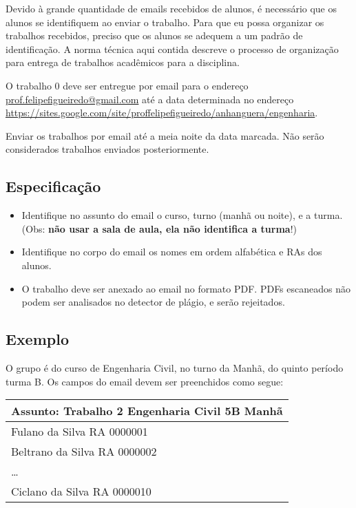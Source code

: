 \documentclass[a4paper]{article}
\begin{document}
Devido à grande quantidade de emails recebidos de alunos, é necessário
que os alunos se identifiquem ao enviar o trabalho. Para que eu possa
organizar os trabalhos recebidos, preciso que os alunos se adequem a
um padrão de identificação. A norma técnica aqui contida descreve o
processo de organização para entrega de trabalhos acadêmicos para a
disciplina.

O trabalho 0 deve ser entregue por email para o endereço
\url{prof.felipefigueiredo@gmail.com} até a data determinada no
endereço
\url{https://sites.google.com/site/proffelipefigueiredo/anhanguera/engenharia}.
 
Enviar os trabalhos por email até a meia noite da data marcada. Não
serão considerados trabalhos enviados posteriormente.

\subsection{Especificação}

\begin{itemize}
\item Identifique no assunto do email o curso, turno (manhã ou noite),
  e a turma. (Obs: {\bf não usar a sala de aula, ela não identifica a turma}!)
\item Identifique no corpo do email os nomes em ordem alfabética e RAs
  dos alunos.
\item O trabalho deve ser anexado ao email no formato PDF. PDFs
  escaneados não podem ser analisados no detector de plágio, e serão
  rejeitados.
\end{itemize}

\subsection{Exemplo}

O grupo é do curso de Engenharia Civil, no turno da Manhã, do quinto
período turma B. Os campos do email devem ser preenchidos como segue:

\begin{tabular}{|l|}
  \hline
  Assunto: Trabalho 2 Engenharia Civil 5B Manhã\\
  \hline
  Fulano da Silva RA 0000001 \\
  Beltrano da Silva RA 0000002 \\
  \ldots \\
  Ciclano da Silva RA 0000010  \\
  \hline
\end{tabular}
 
\end{document}
